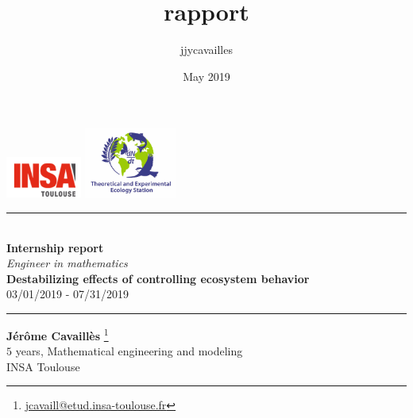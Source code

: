 \documentclass{article}
\title{rapport}
\author{jjycavailles }
\date{May 2019}
\begin{document}
\begin{titlepage}

\begin{center}
  \includegraphics[width = 25mm]{LogoInsa.png} \hfill
  \includegraphics[width = 30mm]{logo_cnrs.jpg}
\end{center}





\vspace*{1cm}

\begin{center}
\rule{\linewidth}{0.7mm} \\
[0.4cm]
\textbf{ \Huge Internship report} \\
[0.2cm]
\large \emph{Engineer in mathematics} \\ 
[0.6cm]
\textbf{ \huge Destabilizing effects of controlling ecosystem behavior} \\
[0.4cm]
03/01/2019 - 07/31/2019 \\
[0.4cm]
\rule{\linewidth}{0.7mm}
\end{center}

\vspace*{0.5cm}

\begin{center}
\textbf{\Large{Jérôme Cavaillès}} \footnote{\url{jcavaill@etud.insa-toulouse.fr}} \\ [0.3cm] $5$ years, Mathematical engineering and modeling \\ INSA Toulouse
\end{center}



\end{titlepage}
\end{document}
